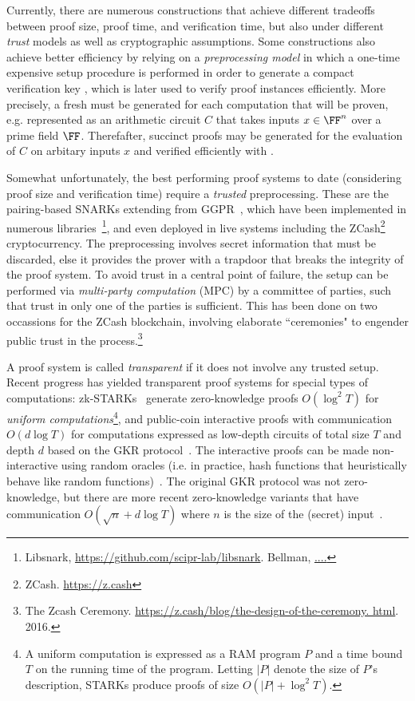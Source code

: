 Currently, there are numerous constructions that achieve different tradeoffs between proof size, proof time, and verification time, but also under different \emph{trust} models as well as cryptographic assumptions. %
Some constructions also achieve better efficiency by relying on a \emph{preprocessing model} in which a one-time expensive setup procedure is performed in order to generate a compact verification key , which is later used to verify proof instances efficiently. More precisely, a fresh  must be generated for each computation that will be proven, e.g. represented as an arithmetic circuit $C$ that takes inputs $x \in \FF^n$ over a prime field $\FF$. Therefafter, succinct proofs may be generated for the evaluation of $C$ on arbitary inputs $x$ and verified efficiently with . 

Somewhat unfortunately, the best performing proof systems to date (considering proof size and verification time) require a \emph{trusted} preprocessing. These are the pairing-based SNARKs extending from GGPR~\cite{EC:GGPR13, ES:SBVBPW13, SP:PHGR13, TCC:BCIOP13, C:BCGTV13, USENIX:BCTV14, EC:Groth16}, which have been implemented in numerous libraries~\footnote{Libsnark, \url{https://github.com/scipr-lab/libsnark}. Bellman, \url{....}}, and even deployed in live systems including the ZCash\footnote{ZCash. \url{https://z.cash}} cryptocurrency. The preprocessing involves secret information that must be discarded, else it provides the prover with a trapdoor that breaks the integrity of the proof system. To avoid trust in a central point of failure, the setup can be performed via \emph{multi-party computation} (MPC) by a committee of parties, such that trust in only one of the parties is sufficient. This has been done on two occassions for the ZCash blockchain, involving elaborate ``ceremonies" to engender public trust in the process.\footnote{The Zcash Ceremony. \url{https://z.cash/blog/the-design-of-the-ceremony.
html}. 2016.}

A proof system is called \emph{transparent} if it does not involve any trusted setup. Recent progress has yielded transparent proof systems for special types of computations: zk-STARKs~\cite{ICALP:BBHR18} generate zero-knowledge proofs $O(\log^2 T)$ for \emph{uniform computations}\footnote{A uniform computation is expressed as a RAM program $P$ and a time bound $T$ on the running time of the program. Letting $|P|$ denote the size of $P$'s description, STARKs produce proofs of size $O(|P| + \log^2 T)$.}, and public-coin interactive proofs with communication $O(d \log T)$ for computations expressed as low-depth circuits of total size $T$ and depth $d$ based on the GKR protocol~\cite{STOC:GolKalRot08}. The interactive proofs can be made non-interactive using random oracles (i.e. in practice, hash functions that heuristically behave like random functions)~\cite{C:FiaSha86,STOC:CCHLRRW19}. The original GKR protocol was not zero-knowledge, but there are more recent zero-knowledge variants that have communication $O( \sqrt{n} + d \log T)$ where $n$ is the size of the (secret) input~\cite{SP:WTSTW18, EPRINT:ZGKPP17b}. 

